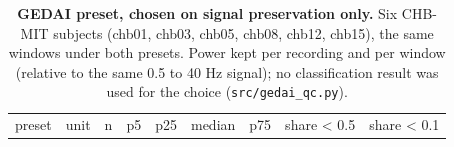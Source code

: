 \documentclass[11pt,a4paper]{article}
\begin{document}
\endgroup

\begingroup\footnotesize

\begin{longtable}[]{@{}
  >{\raggedright\arraybackslash}p{}
  >{\raggedright\arraybackslash}p{}
  >{\raggedright\arraybackslash}p{}
  >{\raggedright\arraybackslash}p{}
  >{\raggedright\arraybackslash}p{}
  >{\raggedright\arraybackslash}p{}
  >{\raggedright\arraybackslash}p{}
  >{\raggedright\arraybackslash}p{}
  >{\raggedright\arraybackslash}p{}@{}}
\caption{\textbf{GEDAI preset, chosen on signal preservation only.} Six CHB-MIT subjects (chb01, chb03, chb05, chb08, chb12, chb15), the same windows under both presets. Power kept per recording and per window (relative to the same 0.5 to 40 Hz signal); no classification result was used for the choice (\nolinkurl{src/gedai_qc.py}).}\tabularnewline
\toprule\noalign{}
\begin{minipage}[b]{\linewidth}\raggedright
preset
\end{minipage} & \begin{minipage}[b]{\linewidth}\raggedright
unit
\end{minipage} & \begin{minipage}[b]{\linewidth}\raggedright
n
\end{minipage} & \begin{minipage}[b]{\linewidth}\raggedright
p5
\end{minipage} & \begin{minipage}[b]{\linewidth}\raggedright
p25
\end{minipage} & \begin{minipage}[b]{\linewidth}\raggedright
median
\end{minipage} & \begin{minipage}[b]{\linewidth}\raggedright
p75
\end{minipage} & \begin{minipage}[b]{\linewidth}\raggedright
share \textless{} 0.5
\end{minipage} & \begin{minipage}[b]{\linewidth}\raggedright
share \textless{} 0.1
\end{minipage} \\

\end{longtable}
\end{document}
